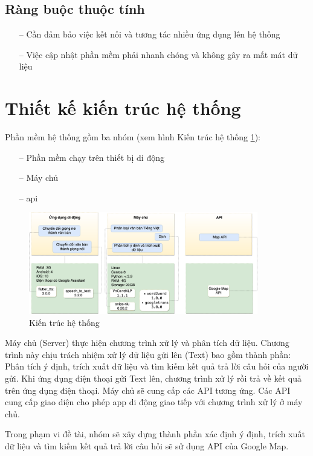 \subsection{Ràng buộc thuộc tính}
\begin{itemize}
    \item[--] Cần đảm bảo việc kết nối và tương tác nhiều ứng dụng lên hệ thống
    \item[--] Việc cập nhật phần mềm phải nhanh chóng và không gây ra mất mát dữ liệu
\end{itemize}

\section{Thiết kế kiến trúc hệ thống}
Phần mềm hệ thống gồm ba nhóm (xem hình Kiến trúc hệ thống \ref{fig:kien-truc-he-thong}):
\begin{itemize}
    \item[--] Phần mềm chạy trên thiết bị di động
    \item[--] Máy chủ
    \item[--] \ac{api}
\end{itemize}
\begin{figure}[htp]
    \centering
    \includegraphics[width=10cm]{images/Structure-System.png}
    \caption{Kiến trúc hệ thống}
    \label{fig:kien-truc-he-thong}
\end{figure}

Máy chủ (Server) thực hiện chương trình xử lý và phân tích dữ liệu. Chương trình này chịu trách nhiệm xử lý dữ liệu gửi lên (Text) bao gồm thành phần: Phân tích ý định, trích xuất dữ liệu và tìm kiếm kết quả trả lời câu hỏi của người gửi. Khi ứng dụng điện thoại gửi Text lên, chương trình xử lý rồi trả về kết quả trên ứng dụng điện thoại. Máy chủ sẽ cung cấp các API tương ứng. Các API cung cấp giao diện cho phép app di động giao tiếp với chương trình xử lý ở máy chủ.

Trong phạm vi đề tài, nhóm sẽ xây dựng thành phần xác định ý định, trích xuất dữ liệu và tìm kiếm kết quả trả lời câu hỏi sẽ sử dụng API của Google Map\cite{google-map}.

